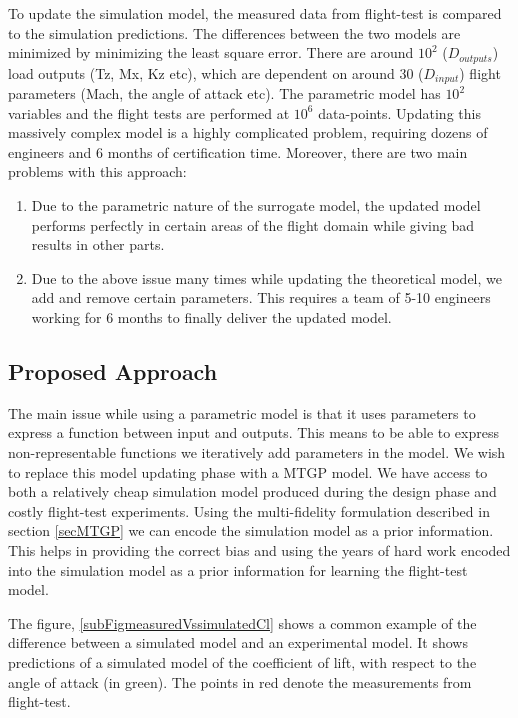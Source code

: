 To update the simulation model, the measured data from flight-test is compared to the simulation predictions. The differences between the two models are minimized by minimizing the least square error. There are around $10^2$ ($D_{outputs}$) load outputs (Tz, Mx, Kz etc), which are dependent on around 30 ($D_{input}$) flight parameters (Mach, the angle of attack etc). The parametric model has $10^2$ variables and the flight tests are performed at $10^6$ data-points. Updating this massively complex model is a highly complicated problem, requiring dozens of engineers and 6 months of certification time. Moreover, there are two main problems with this approach: 


\begin{enumerate}
\item Due to the parametric nature of the surrogate model, the updated model performs perfectly in certain areas of the flight domain while giving bad results in other parts. 
\item Due to the above issue many times while updating the theoretical model, we add and remove certain parameters. This requires a team of 5-10 engineers working for 6 months to finally deliver the updated model.
\end{enumerate}

\subsection{Proposed Approach}
The main issue while using a parametric model is that it uses parameters to express a function between input and outputs. This means to be able to express non-representable functions we iteratively add parameters in the model. We wish to replace this model updating phase with a MTGP model. We have access to both a relatively cheap simulation model produced during the design phase and costly flight-test experiments. Using the multi-fidelity formulation described in section \ref{secMTGP} we can encode the simulation model as a prior information. This helps in providing the correct bias and using the years of hard work encoded into the simulation model as a prior information for learning the flight-test model.

The figure, \ref{subFigmeasuredVssimulatedCl} shows a common example of the difference between a simulated model and an experimental model. It shows predictions of a simulated model of the coefficient of lift, with respect to the angle of attack (in green). The points in red denote the measurements from flight-test.  

